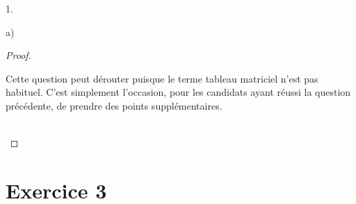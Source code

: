 \documentclass[11pt]{article}%
\begin{document}
\begin{noliste}{1.}
\begin{noliste}{a)}
    \begin{proof}~%
    \begin{remark}%
      Cette question peut dérouter puisque le terme \og tableau
      matriciel \fg{} n'est pas habituel. C'est simplement l'occasion,
      pour les candidats ayant réussi la question précédente, de
      prendre des points supplémentaires.
    \end{remark}~\\[-1.2cm]
    \end{proof}
  \end{noliste}
\end{noliste}


\newpage


\section*{Exercice 3}
\end{document}
